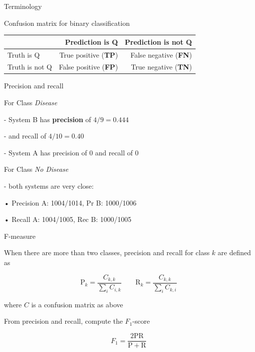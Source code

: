 \documentclass[12pt]{beamer}
\begin{document}
\begin{frame}{Terminology}
	
	Confusion matrix for binary classification
	
	\begin{table}
		\begin{footnotesize}
			\begin{tabular}{l|rr}
				& Prediction is Q & Prediction is not Q \\ \hline
				Truth is Q & True positive (\textbf{TP}) & False negative (\textbf{FN}) \\
				Truth is not Q & False positive (\textbf{FP}) & True negative (\textbf{TN}) 
			\end{tabular}
		\end{footnotesize}
	\end{table}
	
	
\end{frame}




\begin{frame}{Precision and recall}
	
For Class \emph{Disease}

- System B has \textbf{precision} of $4/9 = 0.444$

- and recall of $4/10 = 0.40$

- System A has precision of $0$ and recall of $0$

\bigskip

For Class \emph{No Disease}

- both systems are very close:

• Precision A: 1004/1014, Pr B: 1000/1006

• Recall A: 1004/1005, Rec B: 1000/1005

\end{frame}

\begin{frame}{F-measure}
	
When there are more than two classes, precision and recall for class $k$ are defined as

$$
\mathrm{P}_k = \frac{C_{k,k}}{ \sum_{i} C_{i,k}}
\qquad
\mathrm{R}_k =  \frac{C_{k,k}}{ \sum_{i} C_{k,i}}
$$

where $C$ is a confusion matrix as above

\bigskip

From precision and recall, compute the $F_1$-score 

$$
F_1 = \frac{2 \mathrm{P} \mathrm{R}}{\mathrm{P} + \mathrm{R}}
$$

	
\end{frame}
\end{document}
